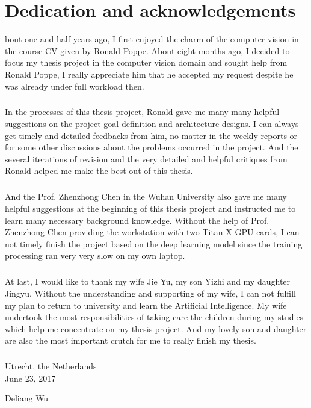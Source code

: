 %
%

\chapter*{Dedication and acknowledgements}
\begin{SingleSpace}
bout one and half years ago, I first enjoyed the charm of the computer vision in the course CV given by Ronald Poppe. About eight months ago, I decided to focus my thesis project in the computer vision domain and sought help from Ronald Poppe, I really appreciate him that he accepted my request despite he was already under full workload then. 

\paragraph{} 
In the processes of this thesis project, Ronald gave me many many helpful suggestions on the project goal definition and architecture designs. I can always get timely and detailed feedbacks from him, no matter in the weekly reports or for some other discussions about the problems occurred in the project. And the several iterations of revision and the very detailed and helpful critiques from Ronald helped me make the best out of this thesis.

\paragraph{}
And the Prof. Zhenzhong Chen in the Wuhan University also gave me many helpful suggestions at the beginning of this thesis project and instructed me to learn many necessary background knowledge. Without the help of Prof. Zhenzhong Chen providing the workstation with two Titan X GPU cards, I can not timely finish the project based on the deep learning model since the training processing ran very very slow on my own laptop. 

\paragraph{}
At last, I would like to thank my wife Jie Yu, my son Yizhi and my daughter Jingyu. Without the understanding and supporting of my wife, I can not fulfill my plan to return to university and learn the Artificial Intelligence. My wife undertook the most responsibilities of taking care the children during my studies which help me concentrate on my thesis project. And my lovely son and daughter are also the most important crutch for me to really finish my thesis. 

\paragraph{}

Utrecht, the Netherlands \\
June 23, 2017
\begin{flushright}
	{Deliang Wu}
\end{flushright}                
    
    
\end{SingleSpace}
\clearpage